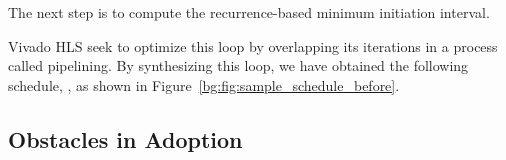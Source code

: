 The next step is to compute the recurrence-based minimum initiation interval.

Vivado HLS seek to optimize this loop by overlapping its iterations in a
process called pipelining.  By synthesizing this loop, we have obtained the
following schedule, , as shown in
Figure~\ref{bg:fig:sample_schedule_before}.


\subsection{Obstacles in Adoption}
\label{sub:obstacles_in_adoption}


